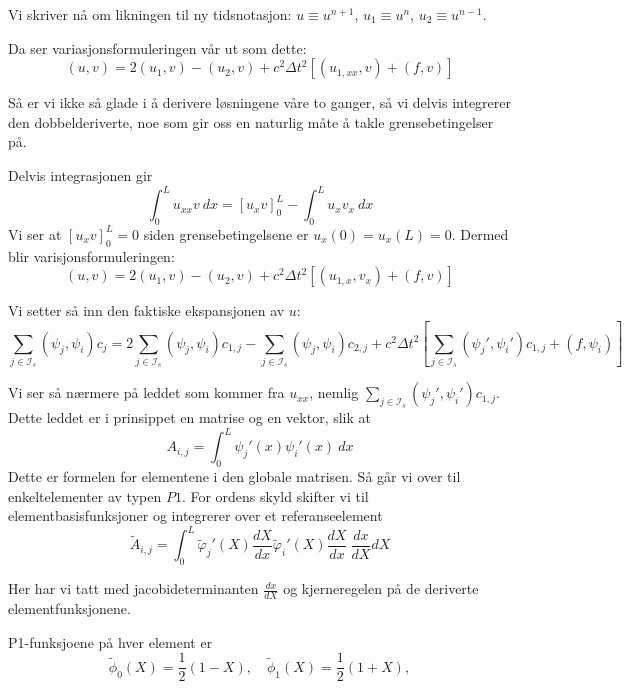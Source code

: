 \documentclass[a4paper, 10pt]{article}
\newcommand{\mc}{\mathcal}
\begin{document}
Vi skriver nå om likningen til ny tidsnotasjon: $u \equiv u^{n+1}$, $u_1 \equiv u^n$, $u_2 \equiv u^{n-1}$.

Da ser variasjonsformuleringen vår ut som dette:
\begin{equation}
(u, v) = 2(u_1, v) - (u_2, v) + c^2\Delta t^2\left[(u_{1, xx}, v) + (f, v)\right]
\end{equation}

Så er vi ikke så glade i å derivere løsningene våre to ganger, så vi delvis integrerer den dobbelderiverte, noe som gir oss en naturlig måte å takle grensebetingelser på.

Delvis integrasjonen gir
\begin{equation}
	\int_0^L u_{xx} v \ dx = [u_xv]_0^L - \int_0^L u_xv_x \ dx
\end{equation}
Vi ser at $[u_xv]_0^L = 0$ siden grensebetingelsene er $u_x(0) = u_x(L) = 0$.
Dermed blir varisjonsformuleringen:
\begin{equation}
	(u, v) = 2(u_1, v) - (u_2, v) + c^2\Delta t^2\left[(u_{1,x}, v_x) + (f, v)\right]
\end{equation}

Vi setter så inn den faktiske ekspansjonen av $u$:
\begin{equation}
	\sum_{j \in \mc{I}_s } (\psi_j, \psi_i)c_j = 2\sum_{j \in \mc{I}_s }(\psi_j, \psi_i)c_{1, j} - \sum_{j \in \mc{I}_s }(\psi_j, \psi_i)c_{2, j} + c^2\Delta t^2 \left[\sum_{j \in \mc{I}_s } (\psi_j', \psi_i')c_{1, j} + (f, \psi_i)\right]
\end{equation}

Vi ser så nærmere på leddet som kommer fra $u_{xx}$, nemlig $\sum_{j \in \mc{I}_s } (\psi_j', \psi_i')c_{1, j}$. 
Dette leddet er i prinsippet en matrise og en vektor, slik at 
\begin{equation}
	A_{i, j} = \int_0^L \psi_j'(x)\psi_i'(x) \ dx
\end{equation}
Dette er formelen for elementene i den globale matrisen. Så går vi over til enkeltelementer av typen $P1$.
For ordens skyld skifter vi til elementbasisfunksjoner og integrerer over et referanseelement
\begin{equation}
	\tilde{A}_{i, j} = \int_0^L \tilde{\varphi}_j'(X)\frac{dX}{dx}\tilde{\varphi}_i'(X)\frac{dX}{dx} \ \frac{dx}{dX} dX
\end{equation}

Her har vi tatt med jacobideterminanten $\frac{dx}{dX}$ og kjerneregelen på de deriverte elementfunksjonene. 

P1-funksjoene på hver element er
\begin{equation}
	\tilde{\phi}_0(X)=\frac{1}{2}(1-X),\quad\tilde{\phi}_1(X)=\frac{1}{2}(1+X),
\end{equation}
\end{document}
